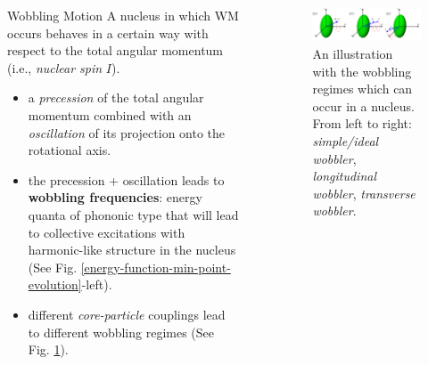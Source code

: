 \documentclass[final]{beamer}
\newlength{\sepwidth}
\newlength{\colwidth}
\newcommand{\separatorcolumn}{\begin{column}{\sepwidth}\end{column}}
\begin{document}
\begin{frame}[t]
\begin{columns}[t]
\begin{column}{\colwidth}
\begin{block}{Wobbling Motion}
  A nucleus in which WM occurs behaves in a certain way with respect to the total angular momentum (i.e., \emph{nuclear spin} $I$).
  \begin{itemize}
    \item a \emph{precession} of the total angular momentum combined with an \emph{oscillation} of its projection onto the rotational axis.
    \item the precession + oscillation leads to \textbf{wobbling frequencies}: energy quanta of phononic type that will lead to collective excitations with harmonic-like structure in the nucleus  (See Fig. \ref{energy-function-min-point-evolution}-left).
    \item different \emph{core-particle} couplings lead to different wobbling regimes (See Fig. \ref{wobbling-regimes}).
\end{itemize}
 
 
\end{block}
\end{column}

\separatorcolumn

\begin{column}{\colwidth}


\begin{figure}
      \centering
      \includegraphics[scale=1.7]{images/wobbling_Regimes_COUPLING_SCHEME.pdf}
      \caption{An illustration with the wobbling regimes which can occur in a nucleus. From left to right: \emph{simple/ideal wobbler}, \emph{longitudinal wobbler}, \emph{transverse wobbler}.}
      \label{wobbling-regimes}
  \end{figure}


\end{column}
\end{columns}
\end{frame}
\end{document}
